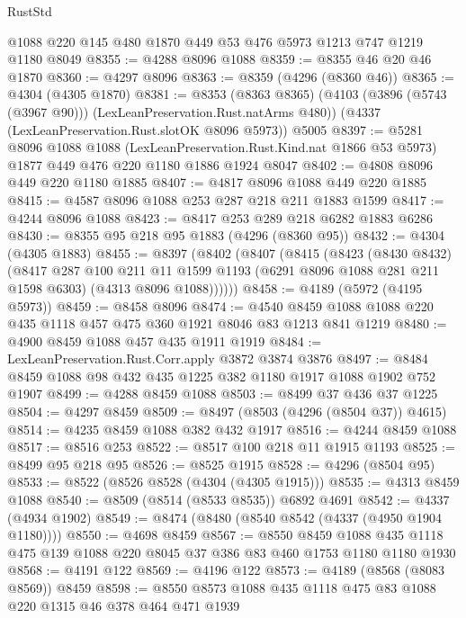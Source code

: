 \begin{lexlean}{RustStd}
\begin{coremodule}
    @1088
    @220
    @145
    @480
    @1870
    @449
    @53
    @476
    @5973
    @1213
    @747
    @1219
    @1180
    @8049
@8355 := @4288 @8096 @1088
@8359 := @8355 @46 @20 @46 @1870
@8360 := @4297 @8096
@8363 := @8359 (@4296 (@8360 @46))
@8365 := @4304 (@4305 @1870)
@8381 := @8353
    (@8363 @8365)
    (@4103 (@3896 (@5743 (@3967 @90))) (LexLeanPreservation.Rust.natArms @480))
    (@4337 (LexLeanPreservation.Rust.slotOK @8096 @5973))
    @5005
@8397 := @5281
    @8096
    @1088
    @1088
    (LexLeanPreservation.Rust.Kind.nat @1866 @53 @5973)
    @1877
    @449
    @476
    @220
    @1180
    @1886
    @1924
    @8047
@8402 := @4808 @8096 @449 @220 @1180 @1885
@8407 := @4817 @8096 @1088 @449 @220 @1885
@8415 := @4587 @8096 @1088 @253 @287 @218 @211 @1883 @1599
@8417 := @4244 @8096 @1088
@8423 := @8417 @253 @289 @218 @6282 @1883 @6286
@8430 := @8355 @95 @218 @95 @1883 (@4296 (@8360 @95))
@8432 := @4304 (@4305 @1883)
@8455 := @8397
    (@8402
      (@8407
        (@8415
          (@8423
            (@8430 @8432)
            (@8417
              @287
              @100
              @211
              @11
              @1599
              @1193
              (@6291 @8096 @1088 @281 @211 @1598 @6303)
              (@4313 @8096 @1088))))))
@8458 := @4189 (@5972 (@4195 @5973))
@8459 := @8458 @8096
@8474 := @4540 @8459 @1088 @1088 @220 @435 @1118 @457 @475 @360 @1921 @8046 @83 @1213 @841 @1219
@8480 := @4900 @8459 @1088 @457 @435 @1911 @1919
@8484 := LexLeanPreservation.Rust.Corr.apply @3872 @3874 @3876
@8497 := @8484 @8459 @1088 @98 @432 @435 @1225 @382 @1180 @1917 @1088 @1902 @752 @1907
@8499 := @4288 @8459 @1088
@8503 := @8499 @37 @436 @37 @1225
@8504 := @4297 @8459
@8509 := @8497 (@8503 (@4296 (@8504 @37)) @4615)
@8514 := @4235 @8459 @1088 @382 @432 @1917
@8516 := @4244 @8459 @1088
@8517 := @8516 @253
@8522 := @8517 @100 @218 @11 @1915 @1193
@8525 := @8499 @95 @218 @95
@8526 := @8525 @1915
@8528 := @4296 (@8504 @95)
@8533 := @8522 (@8526 @8528 (@4304 (@4305 @1915)))
@8535 := @4313 @8459 @1088
@8540 := @8509 (@8514 (@8533 @8535)) @6892 @4691
@8542 := @4337 (@4934 @1902)
@8549 := @8474 (@8480 (@8540 @8542 (@4337 (@4950 @1904 @1180))))
@8550 := @4698 @8459
@8567 := @8550
    @8459
    @1088
    @435
    @1118
    @475
    @139
    @1088
    @220
    @8045
    @37
    @386
    @83
    @460
    @1753
    @1180
    @1180
    @1930
@8568 := @4191 @122
@8569 := @4196 @122
@8573 := @4189 (@8568 (@8083 @8569)) @8459
@8598 := @8550
    @8573
    @1088
    @435
    @1118
    @475
    @83
    @1088
    @220
    @1315
    @46
    @378
    @464
    @471
    @1939

\end{coremodule}
\end{lexlean}
